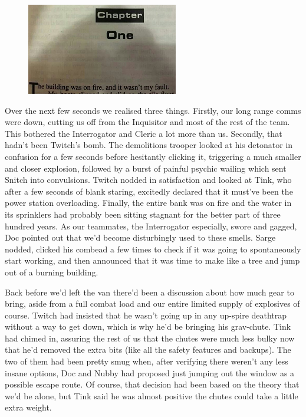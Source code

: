 \begin{figure}
	\begin{center}
		\includegraphics[width=\figwidth]{pics/18/35.png}
	\end{center}
\end{figure}
Over the next few seconds we realised three things. 
Firstly, our long range comms were down, cutting us off from the Inquisitor and most of the rest of the team. 
This bothered the Interrogator and Cleric a lot more than us. 
Secondly, that hadn't been Twitch's bomb. 
The demolitions trooper looked at his detonator in confusion for a few seconds before hesitantly clicking it, triggering a much smaller and closer explosion, followed by a burst of painful psychic wailing which sent Snitch into convulsions. 
Twitch nodded in satisfaction and looked at Tink, who after a few seconds of blank staring, excitedly declared that it must've been the power station overloading. 
Finally, the entire bank was on fire and the water in its sprinklers had probably been sitting stagnant for the better part of three hundred years. 
As our teammates, the Interrogator especially, swore and gagged, Doc pointed out that we'd become disturbingly used to these smells. 
Sarge nodded, clicked his combead a few times to check if it was going to spontaneously start working, and then announced that it was time to make like a tree and jump out of a burning building.

Back before we'd left the van there'd been a discussion about how much gear to bring, aside from a full combat load and our entire limited supply of explosives of course. 
Twitch had insisted that he wasn't going up in any up-spire deathtrap without a way to get down, which is why he'd be bringing his grav-chute. 
Tink had chimed in, assuring the rest of us that the chutes were much less bulky now that he'd removed the extra bits (like all the safety features and backups). 
The two of them had been pretty smug when, after verifying there weren't any less insane options, Doc and Nubby had proposed just jumping out the window as a possible escape route. 
Of course, that decision had been based on the theory that we'd be alone, but Tink said he was almost positive the chutes could take a little extra weight.

